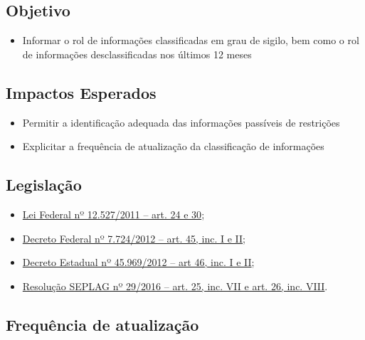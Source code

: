 \documentclass[
]{book}
\providecommand{\tightlist}{%
  \setlength{\itemsep}{0pt}\setlength{\parskip}{0pt}}
\begin{document}
\hypertarget{objetivo-1}{%
\subsection{Objetivo}\label{objetivo-1}}

\begin{itemize}
\tightlist
\item
  Informar o rol de informações classificadas em grau de sigilo, bem como o rol de informações desclassificadas nos últimos 12 meses
\end{itemize}

\hypertarget{impactos-esperados-2}{%
\subsection{Impactos Esperados}\label{impactos-esperados-2}}

\begin{itemize}
\tightlist
\item
  Permitir a identificação adequada das informações passíveis de restrições
\item
  Explicitar a frequência de atualização da classificação de informações
\end{itemize}

\hypertarget{legislauxe7uxe3o-2}{%
\subsection{Legislação}\label{legislauxe7uxe3o-2}}

\begin{itemize}
\tightlist
\item
  \href{http://www.planalto.gov.br/ccivil_03/_ato2011-2014/2011/lei/l12527.htm\#art24}{Lei Federal nº 12.527/2011 -- art. 24 e 30};
\item
  \href{http://www.planalto.gov.br/ccivil_03/_ato2011-2014/2012/decreto/d7724.htm\#art45}{Decreto Federal nº 7.724/2012 -- art. 45, inc. I e II};
\item
  \href{https://www.almg.gov.br/consulte/legislacao/completa/completa.html?tipo=DEC\&num=45969\&ano=2012}{Decreto Estadual nº 45.969/2012 -- art 46, inc. I e II};
\item
  \href{http://www.planejamento.mg.gov.br/sites/default/files/documentos/resolucao_sitios_seplag_29_de_05_07_2016_1.pdf}{Resolução SEPLAG nº 29/2016 -- art. 25, inc. VII e art. 26, inc. VIII}.
\end{itemize}

\hypertarget{frequuxeancia-de-atualizauxe7uxe3o-1}{%
\subsection{Frequência de atualização}\label{frequuxeancia-de-atualizauxe7uxe3o-1}}
\end{document}

